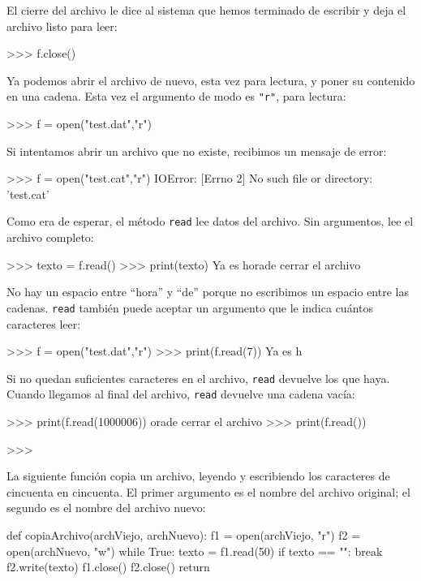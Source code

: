 El cierre del archivo le dice al sistema que hemos terminado de escribir
y deja el archivo listo para leer:
\begin{pyconcode}
>>> f.close()
\end{pyconcode}

Ya podemos abrir el archivo de nuevo, esta vez para lectura, y poner
su contenido en una cadena. Esta vez el argumento de modo es {\verb+"r"+},
para lectura:
\begin{pyconcode}
>>> f = open("test.dat","r")
\end{pyconcode}

Si intentamos abrir un archivo que no existe, recibimos un mensaje
de error:

\begin{pyconcode}
>>> f = open("test.cat","r")
IOError: [Errno 2] No such file or directory: 'test.cat'
\end{pyconcode}

Como era de esperar, el método \texttt{read} lee datos del archivo.
Sin argumentos, lee el archivo completo:
\begin{pyconcode}
>>> texto = f.read()
>>> print(texto)
Ya es horade cerrar el archivo
\end{pyconcode}

No hay un espacio entre ``hora'' y ``de'' porque no escribimos
un espacio entre las cadenas. \texttt{read} también puede aceptar
un argumento que le indica cuántos caracteres leer:
\begin{pyconcode}
>>> f = open("test.dat","r")
>>> print(f.read(7))
Ya es h
\end{pyconcode}

Si no quedan suficientes caracteres en el archivo, \texttt{read} devuelve
los que haya. Cuando llegamos al final del archivo, \texttt{read}
devuelve una cadena vacía:
\begin{pyconcode}
>>> print(f.read(1000006))
orade cerrar el archivo
>>> print(f.read())

>>>
\end{pyconcode}

La siguiente función copia un archivo, leyendo y escribiendo los caracteres
de cincuenta en cincuenta. El primer argumento es el nombre del archivo
original; el segundo es el nombre del archivo nuevo:
\begin{pythoncode}
def copiaArchivo(archViejo, archNuevo):
  f1 = open(archViejo, "r")
  f2 = open(archNuevo, "w")
  while True:
    texto = f1.read(50)
    if texto == "":
      break
    f2.write(texto)
  f1.close()
  f2.close()
  return
\end{pythoncode}

